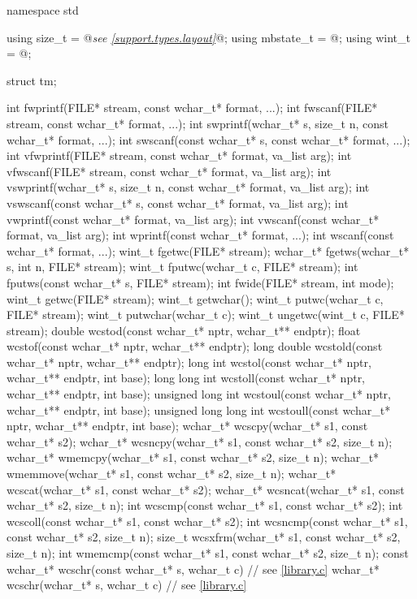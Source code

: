 \begin{codeblock}
namespace std {
  using size_t = @\textit{see \ref{support.types.layout}}@;
  using mbstate_t = @\seebelow@;
  using wint_t = @\seebelow@;

  struct tm;

  int fwprintf(FILE* stream, const wchar_t* format, ...);
  int fwscanf(FILE* stream, const wchar_t* format, ...);
  int swprintf(wchar_t* s, size_t n, const wchar_t* format, ...);
  int swscanf(const wchar_t* s, const wchar_t* format, ...);
  int vfwprintf(FILE* stream, const wchar_t* format, va_list arg);
  int vfwscanf(FILE* stream, const wchar_t* format, va_list arg);
  int vswprintf(wchar_t* s, size_t n, const wchar_t* format, va_list arg);
  int vswscanf(const wchar_t* s, const wchar_t* format, va_list arg);
  int vwprintf(const wchar_t* format, va_list arg);
  int vwscanf(const wchar_t* format, va_list arg);
  int wprintf(const wchar_t* format, ...);
  int wscanf(const wchar_t* format, ...);
  wint_t fgetwc(FILE* stream);
  wchar_t* fgetws(wchar_t* s, int n, FILE* stream);
  wint_t fputwc(wchar_t c, FILE* stream);
  int fputws(const wchar_t* s, FILE* stream);
  int fwide(FILE* stream, int mode);
  wint_t getwc(FILE* stream);
  wint_t getwchar();
  wint_t putwc(wchar_t c, FILE* stream);
  wint_t putwchar(wchar_t c);
  wint_t ungetwc(wint_t c, FILE* stream);
  double wcstod(const wchar_t* nptr, wchar_t** endptr);
  float wcstof(const wchar_t* nptr, wchar_t** endptr);
  long double wcstold(const wchar_t* nptr, wchar_t** endptr);
  long int wcstol(const wchar_t* nptr, wchar_t** endptr, int base);
  long long int wcstoll(const wchar_t* nptr, wchar_t** endptr, int base);
  unsigned long int wcstoul(const wchar_t* nptr, wchar_t** endptr, int base);
  unsigned long long int wcstoull(const wchar_t* nptr, wchar_t** endptr, int base);
  wchar_t* wcscpy(wchar_t* s1, const wchar_t* s2);
  wchar_t* wcsncpy(wchar_t* s1, const wchar_t* s2, size_t n);
  wchar_t* wmemcpy(wchar_t* s1, const wchar_t* s2, size_t n);
  wchar_t* wmemmove(wchar_t* s1, const wchar_t* s2, size_t n);
  wchar_t* wcscat(wchar_t* s1, const wchar_t* s2);
  wchar_t* wcsncat(wchar_t* s1, const wchar_t* s2, size_t n);
  int wcscmp(const wchar_t* s1, const wchar_t* s2);
  int wcscoll(const wchar_t* s1, const wchar_t* s2);
  int wcsncmp(const wchar_t* s1, const wchar_t* s2, size_t n);
  size_t wcsxfrm(wchar_t* s1, const wchar_t* s2, size_t n);
  int wmemcmp(const wchar_t* s1, const wchar_t* s2, size_t n);
  const wchar_t* wcschr(const wchar_t* s, wchar_t c)  // see \ref{library.c}
  wchar_t* wcschr(wchar_t* s, wchar_t c)  // see \ref{library.c}
}
\end{codeblock}
